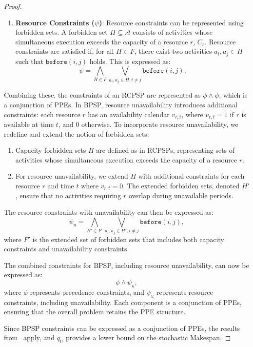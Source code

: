 \documentclass{article}
\begin{document}
\begin{proof}
\begin{enumerate}
    \item \textbf{Resource Constraints (\( \psi \))}: Resource constraints can be represented using forbidden sets. A forbidden set \( H \subseteq \mathcal{A} \) consists of activities whose simultaneous execution exceeds the capacity of a resource \( r \), $C_r$. Resource constraints are satisfied if, for all \( H \in F \), there exist two activities \( a_i, a_j \in H \) such that \( \texttt{before}(i, j) \) holds. This is expressed as:
    \[
    \psi = \bigwedge_{H \in F} \bigvee_{a_i, a_j \in H, i \neq j} \texttt{before}(i, j).
    \]
\end{enumerate} Combining these, the constraints of an RCPSP are represented as \( \phi \wedge \psi \), which is a conjunction of PPEs. In BPSP, resource unavailability introduces additional constraints:
each resource \( r \) has an availability calendar \( v_{r,t} \), where \( v_{r,t} = 1 \) if \( r \) is available at time \( t \), and \( 0 \) otherwise.
To incorporate resource unavailability, we redefine and extend the notion of forbidden sets:
\begin{enumerate}
    \item Capacity forbidden sets \( H \) are defined as in RCPSPs, representing sets of activities whose simultaneous execution exceeds the capacity of a resource \( r \).
    \item For resource unavailability, we extend \(H\) with additional constraints for each resource \( r \) and time \( t \) where \( v_{r,t} = 0 \). The extended forbidden sets, denoted $H'$, ensure that no activities requiring \( r \) overlap during unavailable periods.
\end{enumerate} The resource constraints with unavailability can then be expressed as:
\[
\psi_u = \bigwedge_{H' \in F'} \bigvee_{a_i, a_j \in H', i \neq j} \texttt{before}(i, j),
\]
where \( F' \) is the extended set of forbidden sets that includes both capacity constraints and unavailability constraints.

The combined constraints for BPSP, including resource unavailability, can now be expressed as:
\[
\phi \wedge \psi_u,
\]
where \( \phi \) represents precedence constraints, and \( \psi_u \) represents resource constraints, including unavailability. Each component is a conjunction of PPEs, ensuring that the overall problem retains the PPE structure.

Since BPSP constraints can be expressed as a conjunction of PPEs, the results from~\cite{beck2007proactive} apply, and \( q_U \) provides a lower bound on the stochastic Makespan.

\end{proof} 
\end{document}
